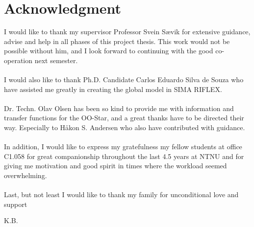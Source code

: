 \chapter*{Acknowledgment}
I would like to thank my supervisor Professor Svein Sævik for extensive guidance, advise and help in all phases of this project thesis. This work would not be possible without him, and I look forward to continuing with the good co-operation next semester. \\\\I would also like to thank Ph.D. Candidate Carlos Eduardo Silva de Souza who have assisted me greatly in creating the global model in SIMA RIFLEX. \\\\  Dr. Techn. Olav Olsen has been so kind to provide me with information and transfer functions for the OO-Star, and a great thanks have to be directed their way. Especially to Håkon S. Andersen who also have contributed with guidance. \\\\ In addition, I would like to express my gratefulness my fellow students at office C1.058 for great companionship throughout the last 4.5 years at NTNU and for giving me motivation and good spirit in times where the workload seemed overwhelming. \\\\ Last, but not least I would like to thank my family for unconditional love and support


\newline
\newline
\newline

\begin{flushright}
K.B.
\end{flushright}